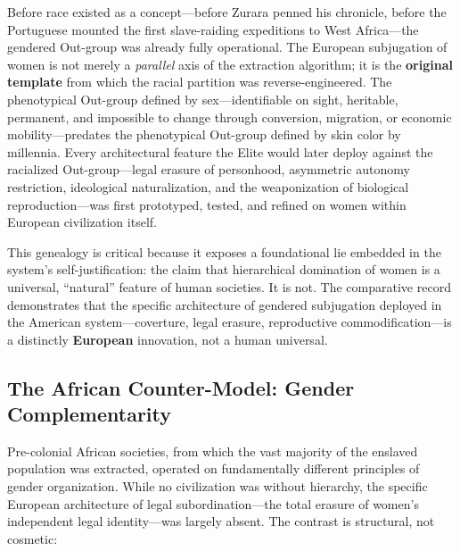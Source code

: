 \documentclass[12pt,openany]{book}
\begin{document}
Before race existed as a concept---before Zurara penned his chronicle, before the Portuguese mounted the first slave-raiding expeditions to West Africa---the gendered Out-group was already fully operational. The European subjugation of women is not merely a \textit{parallel} axis of the extraction algorithm; it is the \textbf{original template} from which the racial partition was reverse-engineered. The phenotypical Out-group defined by sex---identifiable on sight, heritable, permanent, and impossible to change through conversion, migration, or economic mobility---predates the phenotypical Out-group defined by skin color by millennia. Every architectural feature the Elite would later deploy against the racialized Out-group---legal erasure of personhood, asymmetric autonomy restriction, ideological naturalization, and the weaponization of biological reproduction---was first prototyped, tested, and refined on women within European civilization itself.

This genealogy is critical because it exposes a foundational lie embedded in the system's self-justification: the claim that hierarchical domination of women is a universal, ``natural'' feature of human societies. It is not. The comparative record demonstrates that the specific architecture of gendered subjugation deployed in the American system---coverture, legal erasure, reproductive commodification---is a distinctly \textbf{European} innovation, not a human universal.

\subsection{The African Counter-Model: Gender Complementarity}

Pre-colonial African societies, from which the vast majority of the enslaved population was extracted, operated on fundamentally different principles of gender organization. While no civilization was without hierarchy, the specific European architecture of legal subordination---the total erasure of women's independent legal identity---was largely absent. The contrast is structural, not cosmetic:
\end{document}
